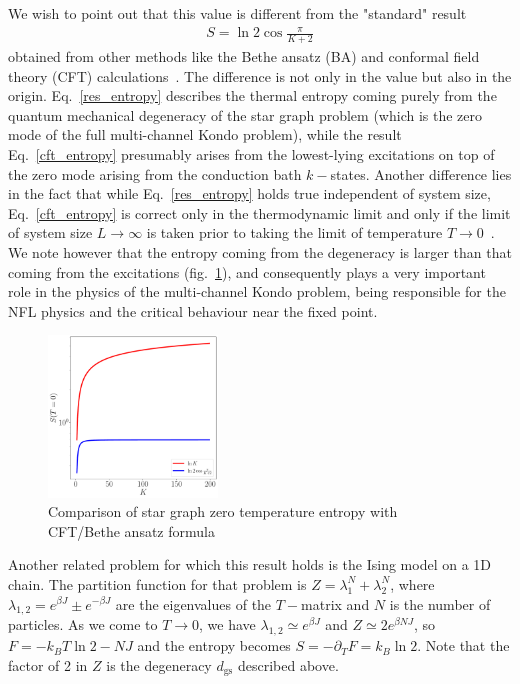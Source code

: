 \documentclass[12pt]{revtex4-2}
\begin{document}
We wish to point out that this value is different from the "standard" result 
\begin{align}
\label{cft_entropy}
S = \ln 2\cos \frac{\pi}{K+2}
\end{align}
obtained from other methods like the Bethe ansatz (BA) and conformal field theory (CFT) calculations~\cite{Gan_Andrei_Coleman_1993,andrei_destri_1984,Tsvelick_weigmann_mchannel_1985,sacramento1989,emery_kivelson,affleck_1991_overscreen}. The difference is not only in the value but also in the origin. Eq.~\ref{res_entropy} describes the thermal entropy coming purely from the quantum mechanical degeneracy of the star graph problem (which is the zero mode of the full multi-channel Kondo problem), while the result Eq.~\ref{cft_entropy} presumably arises from the lowest-lying excitations on top of the zero mode arising from the conduction bath \(k-\)states. Another difference lies in the fact that while Eq.~\ref{res_entropy} holds true independent of system size, Eq.~\ref{cft_entropy} is correct only in the thermodynamic limit and only if the limit of system size \(L \to \infty\) is taken prior to taking the limit of temperature \(T \to 0\)~\cite{Gan_Andrei_Coleman_1993,rozhkov_1998,vondelft_prl_1998}. We note however that the entropy coming from the degeneracy is larger than that coming from the excitations (fig.~\ref{entropy_comparison}), and consequently plays a very important role in the physics of the multi-channel Kondo problem, being responsible for the NFL physics and the critical behaviour near the fixed point.

\begin{figure}[!ht]
	\centering
	\includegraphics[width=0.4\textwidth]{../numerics/entropy_comparison.pdf}
	\caption{Comparison of star graph zero temperature entropy with CFT/Bethe ansatz formula}
	\label{entropy_comparison}
\end{figure}


Another related problem for which this result holds is the Ising model on a 1D chain. The partition function for that problem is \(Z = \lambda_1^N + \lambda_2^N\), where \(\lambda_{1,2} = e^{\beta J} \pm e^{-\beta J} \) are the eigenvalues of the \(T-\)matrix and \(N\) is the number of particles. As we come to \(T \to 0\), we have \(\lambda_{1,2} \simeq e^{\beta J}\) and \(Z \simeq 2 e^{\beta N J}\), so \(F = -k_B T \ln 2 - N J\) and the entropy becomes \(S = - \partial_T F = k_B \ln 2\). Note that the factor of 2 in \(Z\) is the degeneracy \(d_\text{gs}\) described above.
\end{document}
